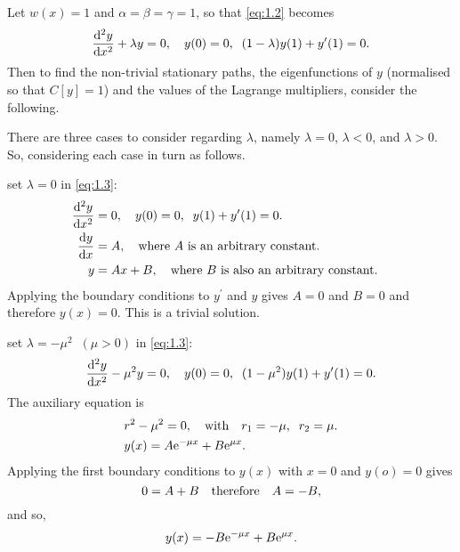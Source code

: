 Let $w(x)=1$ and $\alpha=\beta=\gamma=1$, so that \eqref{eq:1.2} becomes
\begin{equation}
\label{eq:1.3}
\frac{\mathrm{d}^2y}{\mathrm{d}x^2} + \lambda y =0,\quad y(0) = 0,\;\;(1-\lambda )y(1) + y^\prime(1)=0.
\end{equation}
Then to  find the non-trivial  stationary paths, the eigenfunctions of $y$ (normalised so that $C[y]=1$) and the values of the Lagrange multipliers, consider the following.

There are three cases to consider regarding $\lambda$, namely $\lambda=0$, $\lambda<0$, and $\lambda>0$. So, considering each case in turn as follows.
\begin{description}[itemindent=-0.9cm]
\begin{comment}
========================================================================================================================================================
\end{comment}
\item[if $\lambda = 0$]
set $\lambda = 0$ in \eqref{eq:1.3}:
\begin{align*}
	\frac{\mathrm{d}^2y}{\mathrm{d}x^2}&=0,\quad y(0) = 0,\;\;y(1) + y^\prime(1)=0.\\
	\frac{\mathrm{d}y}{\mathrm{d}x} &= A,\quad\text{where $A$ is an arbitrary constant.}\quad\\
	y&= Ax + B,\quad\text{where $B$ is also an arbitrary constant.}\quad
\end{align*}
Applying the boundary conditions to $y^\prime$ and $y$ gives $A=0$ and $B=0$ and therefore $y(x)=0$. This is a trivial solution.
\begin{comment}
========================================================================================================================================================
\end{comment}
\item[If $\lambda < 0$]
set $\lambda = -\mu^2\;\;(\mu > 0)$ in \eqref{eq:1.3}:
\begin{align*}
	\frac{\mathrm{d}^2y}{\mathrm{d}x^2} - \mu^2  y =0,\quad y(0) = 0,\;\;(1- \mu^2)y(1) + y^\prime(1)=0.
\end{align*}
The auxiliary equation is 
\begin{align*}
	&r^2 - \mu^2 = 0, \quad\text{with}\quad r_1 = -\mu,\;\; r_2 = \mu.\\
	&y(x) = A\mathrm{e}^{-\mu x} + B\mathrm{e}^{\mu x}.
\end{align*}
Applying the first boundary conditions to $y(x)$ with $x=0$ and $y(o)=0$ gives
\[
	0=A+B\quad\text{therefore}\quad A=-B,
\]
and so,
\[
	y(x) = -B\mathrm{e}^{-\mu x} + B\mathrm{e}^{\mu x}.
\]
\end{description}

